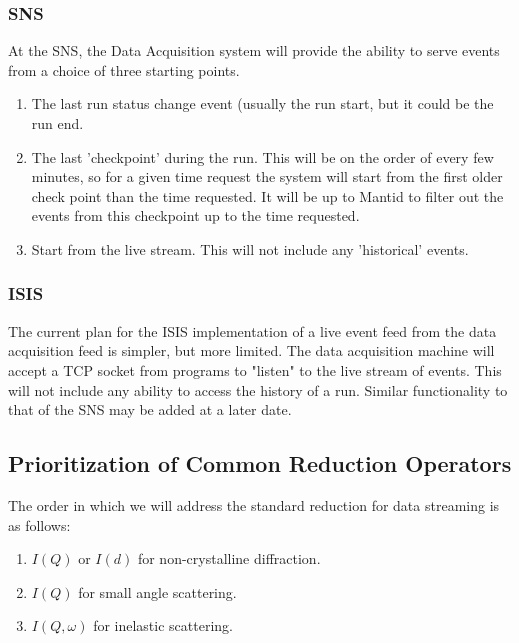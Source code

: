 \subsubsection{SNS}
At the SNS, the Data Acquisition system will provide the ability to serve events from a choice of three starting points.
\begin{enumerate}
\item The last run status change event (usually the run start, but it could be the run end.
\item The last 'checkpoint' during the run.  This will be on the order of every few minutes, so for a given time request the system will start from the first older check point than the time requested.  It will be up to Mantid to filter out the events from this checkpoint up to the time requested.
\item Start from the live stream.  This will not include any 'historical' events. 
\end{enumerate}

\subsubsection{ISIS}
The current plan for the ISIS implementation of a live event feed from the data acquisition feed is simpler, but more limited.  The data acquisition machine will accept a TCP socket from programs to "listen" to the live stream of events.  This will not include any ability to access the history of a run.  Similar functionality to that of the SNS may be added at a later date.

\subsection{Prioritization of Common Reduction Operators}

The order in which we will address the standard reduction for data streaming is as follows:

\begin{enumerate}
\item $I(Q)$ or $I(d)$ for non-crystalline diffraction.
\item $I(Q)$ for small angle scattering.
\item $I(Q,\omega)$ for inelastic scattering.
\end{enumerate}